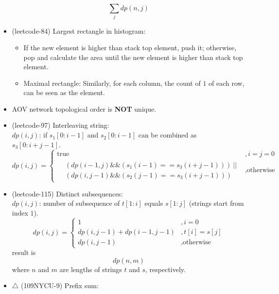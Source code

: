 \begin{itemize}
\begin{equation}
        \sum_{j}dp(n, j)
    \end{equation}
    \item (leetcode-84) Largest rectangle in histogram: \begin{itemize}
        \item If the new element is higher than stack top element, push it; otherwise, pop and calculate the area until the new element is higher than stack top element.
        \item Maximal rectangle: Similarly, for each column, the count of $1$ of each row, can be seen as the element.
    \end{itemize}
    \item AOV network topological order is \textbf{NOT} unique.
    \item (leetcode-97) Interleaving string: \\
    $dp(i, j)$: if $s_1[0: i - 1]$ and $s_2[0: i - 1]$ can be combined as $s_3[0: i + j - 1]$. \begin{equation}
        dp(i, j) = \begin{cases}
            \text{true} &, i = j = 0 \\
            \begin{aligned}
                & (dp(i - 1, j) \&\& (s_1(i - 1) == s_3(i + j - 1))) \ || \\
                & (dp(i, j - 1) \&\& (s_2(j - 1) == s_3(i + j - 1)))
            \end{aligned} &, \text{otherwise}
        \end{cases}
    \end{equation}
    \item (leetcode-115) Distinct subsequences: \\
    $dp(i, j)$: number of subsequence of $t[1: i]$ equals $s[1: j]$ (strings start from index $1$). \begin{equation}
        dp(i, j) = \begin{cases}
            1 &, i = 0 \\
            dp(i, j - 1) + dp(i - 1, j - 1) &, t[i] = s[j] \\
            dp(i, j - 1) &, \text{otherwise}
        \end{cases}            
    \end{equation} result is \begin{equation}
        dp(n, m)
    \end{equation} where $n$ and $m$ are lengths of strings $t$ and $s$, respectively.
    \item $\bigtriangleup$ (109NYCU-9) Prefix sum: \\

\end{itemize}
